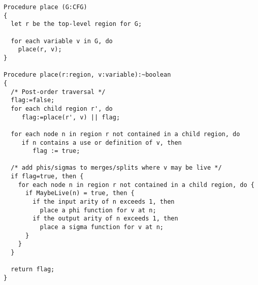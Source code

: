\begin{verbatim}
Procedure place (G:CFG)
{
  let r be the top-level region for G;

  for each variable v in G, do
    place(r, v);
}

Procedure place(r:region, v:variable):~boolean
{
  /* Post-order traversal */
  flag:=false;
  for each child region r', do
     flag:=place(r', v) || flag;

  for each node n in region r not contained in a child region, do
     if n contains a use or definition of v, then
        flag := true;

  /* add phis/sigmas to merges/splits where v may be live */
  if flag=true, then {
    for each node n in region r not contained in a child region, do {
      if MaybeLive(n) = true, then {
        if the input arity of n exceeds 1, then
          place a phi function for v at n;
        if the output arity of n exceeds 1, then
          place a sigma function for v at n;
      }
    }
  }

  return flag;
}
\end{verbatim}
